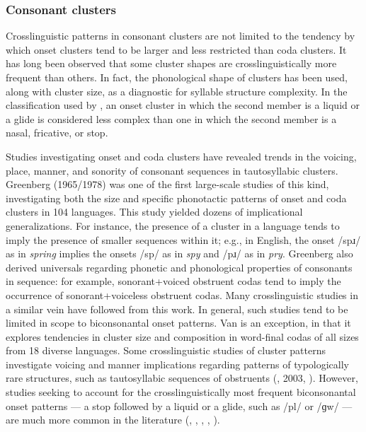 \subsubsection{{Consonant} {clusters}}\label{sec:1.1.2.3}

  Crosslinguistic patterns in consonant clusters are not limited to the tendency by which onset clusters tend to be larger and less restricted than coda clusters. It has long been observed that some cluster shapes are crosslinguistically more frequent than others. In fact, the phonological shape of clusters has been used, along with cluster size, as a diagnostic for syllable structure complexity. In the classification used by \citet{Maddieson2013a}, an onset cluster in which the second member is a liquid or a glide is considered less complex than one in which the second member is a nasal, fricative, or stop.

  Studies investigating onset and coda clusters have revealed trends in the voicing, place, manner, and sonority of consonant sequences in tautosyllabic clusters. Greenberg (1965/1978) was one of the first large-scale studies of this kind, investigating both the size and specific phonotactic patterns of onset and coda clusters in 104 languages. This study yielded dozens of implicational generalizations. For instance, the presence of a cluster in a language tends to imply the presence of smaller sequences within it; e.g., in English, the onset /spɹ/ as in \textit{spring} implies the onsets /sp/ as in \textit{spy} and /pɹ/ as in \textit{pry}. Greenberg also derived universals regarding phonetic and phonological properties of consonants in sequence: for example, sonorant+voiced obstruent codas tend to imply the occurrence of sonorant+voiceless obstruent codas. Many crosslinguistic studies in a similar vein have followed from this work. In general, such studies tend to be limited in scope to biconsonantal onset patterns. Van\citet{Dam2004} is an exception, in that it explores tendencies in cluster size and composition in word-final codas of all sizes from 18 diverse languages. Some crosslinguistic studies of cluster patterns investigate voicing and manner implications regarding patterns of typologically rare structures, such as tautosyllabic sequences of obstruents (\citealt{Morelli1999}, 2003, \citealt{Kreitman2008}). However, studies seeking to account for the crosslinguistically most frequent biconsonantal onset patterns — a stop followed by a liquid or a glide, such as /pl/ or /ɡw/ — are much more common in the literature (\citealt{Clements1990}, \citealt{BerentEtAl2008}, \citealt{BerentEtAl2011}, \citealt{Parker2012}, \citealt{Vennemann2012}). 

